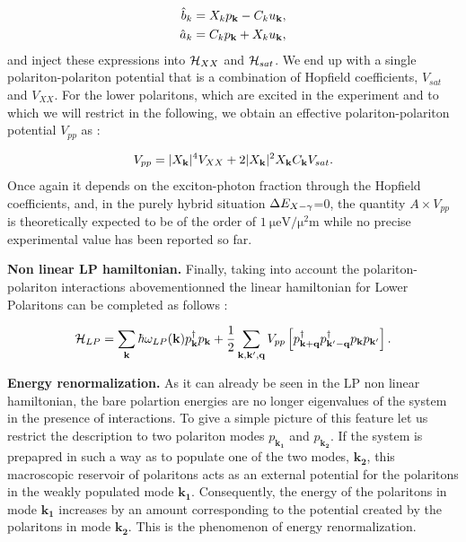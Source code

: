 \begin{subequations}
    \begin{align}
        \hat{b}_k &=X_k p_{\mathbf{k}} -C_ku_{\mathbf{k}}, \\
        \hat{a}_k &=C_k p_{\mathbf{k}} +X_ku_{\mathbf{k}},
    \end{align}
\end{subequations}
and inject these expressions into $\mathcal{H}_{XX}$ and $\mathcal{H}_{sat}$. We end up with a single polariton-polariton potential that is a combination of Hopfield coefficients, $V_{sat}$ and $V_{XX}$.
For the lower polaritons, which are excited in the experiment and to which we will restrict in the following, we obtain an effective polariton-polariton potential $V_{pp}$ as :

\begin{equation}
    V_{pp}= |X_{\mathbf{k}}|^4V_{XX}+2|X_{\mathbf{k}}|^2X_{\mathbf{k}} C_{\mathbf{k}} V_{sat}.
\end{equation}
Once again it depends on the exciton-photon fraction through the Hopfield coefficients, and, in the purely hybrid situation $\Delta E_{X-\gamma}$=0, the quantity $A \times V_{pp}$ is theoretically expected to be of the order of $\SI{1}{\micro\electronvolt \per\square\micro\meter}$ \cite{carusotto_quantum_2013} while
no precise experimental value has been reported so far.

\bigskip

\textbf{Non linear LP hamiltonian.} Finally, taking into account the polariton-polariton interactions abovementionned the linear hamiltonian for Lower Polaritons can be completed as follows :

\begin{equation}
    \mathcal{H}_{LP} = \sum_{\mathbf{k}}\hbar\omega_{LP}(\mathbf{k})p_{\mathbf{k}}^{\dagger}p_{\mathbf{k}} + \dfrac{1}{2}\sum_{\mathbf{k},\mathbf{k}',\mathbf{q}}V_{pp}\left[p_{\mathbf{k}+ \mathbf{q}}^{\dagger}p_{\mathbf{k}'- \mathbf{q}}^{\dagger}p_{\mathbf{k}}p_{\mathbf{k}'}\right].
    \label{eq:pol_non_linear_hamiltonian}
\end{equation}

\textbf{Energy renormalization.} As it can already be seen in the LP non linear hamiltonian, the bare polartion energies are no longer eigenvalues of the system in the presence of interactions.
To give a simple picture of this feature let us restrict the description to two polariton modes $p_{\mathbf{k_1}}$ and $p_{\mathbf{k_2}}$.
If the system is prepapred in such a way as to populate one of the two modes, $\mathbf{k_2}$, this macroscopic reservoir of polaritons acts as an external potential for the polaritons in the weakly populated mode $\mathbf{k_1}$. Consequently, the energy of the polaritons in mode $\mathbf{k_1}$ increases by an amount corresponding to the potential created by the polaritons in mode $\mathbf{k_2}$. 
This is the phenomenon of energy renormalization.

